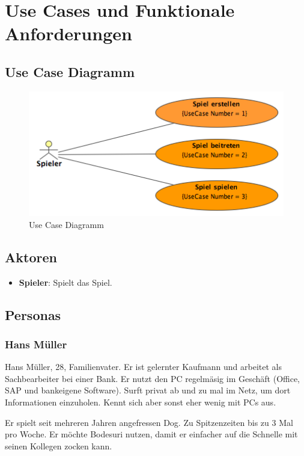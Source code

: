 \documentclass[a4paper,12pt,halfparskip,DIV14]{scrartcl}
\begin{document}


\section{Use Cases und Funktionale Anforderungen} 
\subsection{Use Case Diagramm}\label{sub:use_case_diagramm} 
\begin{figure}
	[htp] \centering 
	\includegraphics[width=0.8 
	\textwidth]{UseCaseDiagramm.png} \caption{Use Case Diagramm}\label{fig:UseCaseDiagramm.png} 
\end{figure}

\subsection{Aktoren}\label{sec:aktoren} 
\begin{itemize}
	\item \textbf{Spieler}: Spielt das Spiel. 
\end{itemize}

\subsection{Personas}\label{sec:personas} 

\subsubsection{Hans Müller}\label{sub:hans_müller} 

Hans Müller, 28, Familienvater. Er ist gelernter Kaufmann und arbeitet als Sachbearbeiter bei einer Bank. Er nutzt den PC regelmäsig im Geschäft (Office, SAP und bankeigene Software). Surft privat ab und zu mal im Netz, um dort Informationen einzuholen. Kennt sich aber sonst eher wenig mit PCs aus. 

Er spielt seit mehreren Jahren angefressen Dog. Zu Spitzenzeiten bis zu 3 Mal pro Woche. Er möchte Bodesuri nutzen, damit er einfacher auf die Schnelle mit seinen Kollegen zocken kann. 
\end{document}
